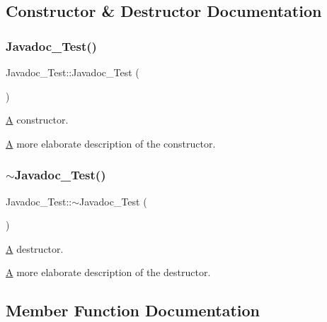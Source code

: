 \subsection{Constructor \& Destructor Documentation}
\mbox{\label{class_javadoc___test_a17313327932ae97596b0a455ba8342cc}} 
\subsubsection{\texorpdfstring{Javadoc\_Test()}{Javadoc\_Test()}}
{\footnotesize\ttfamily Javadoc\+\_\+\+Test\+::\+Javadoc\+\_\+\+Test (\begin{DoxyParamCaption}{ }\end{DoxyParamCaption})}



\mbox{\hyperlink{class_a}{A}} constructor. 

\mbox{\hyperlink{class_a}{A}} more elaborate description of the constructor. \mbox{\label{class_javadoc___test_a60016cd15a4ed82bbc35be79a0a6a6b5}} 
\subsubsection{\texorpdfstring{$\sim$Javadoc\_Test()}{~Javadoc\_Test()}}
{\footnotesize\ttfamily Javadoc\+\_\+\+Test\+::$\sim$\+Javadoc\+\_\+\+Test (\begin{DoxyParamCaption}{ }\end{DoxyParamCaption})}



\mbox{\hyperlink{class_a}{A}} destructor. 

\mbox{\hyperlink{class_a}{A}} more elaborate description of the destructor. 

\subsection{Member Function Documentation}
\mbox{\label{class_javadoc___test_a0c472683ed25ff096e8a9edfb18d550c}} 
